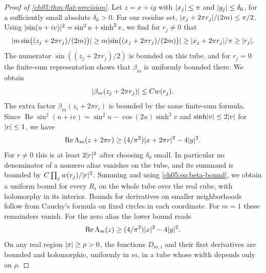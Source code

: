 \begin{proof}[Proof of \cref{ch05:thm:flat-precision}]
Let $z=x+iy$ with $\lvert x_j\rvert\le\pi$ and $\lvert y_j\rvert\le\delta_0$, for a sufficiently small absolute $\delta_0>0$. For our residue set, $\lvert x_j+2\pi r_j\rvert/(2m)\le\pi/2$. Using $\lvert \sin(u+iv)\rvert^2=\sin^2u+\sinh^2v$, we find for $r_j\ne0$ that
\[
 \lvert m\sin\bigl((z_j+2\pi r_j)/(2m)\bigr)\rvert\ge m\lvert \sin\bigl((x_j+2\pi r_j)/(2m)\bigr)\rvert\ge\lvert x_j+2\pi r_j\rvert/\pi\ge\lvert r_j\rvert.
\]
The numerator $\sin((z_j+2\pi r_j)/2)$ is bounded on this tube, and for $r_j=0$ the finite-sum representation shows that $\beta_m$ is uniformly bounded there. We obtain
\begin{equation}\label{ch05:eq:beta-bound}
 \lvert \beta_m(z_j+2\pi r_j)\rvert\le Cw(r_j).
\end{equation}
The extra factor $\beta_m(z_i+2\pi r_i)$ is bounded by the same finite-sum formula. Since $\operatorname{Re}\sin^2(u+iv)=\sin^2u-\cos(2u)\sinh^2v$ and $\sinh\lvert v\rvert\le2\lvert v\rvert$ for $\lvert v\rvert\le1$, we have
\[
 \operatorname{Re}\Lambda_m(z+2\pi r)\ge(4/\pi^2)\lvert x+2\pi r\rvert^2-4\lvert y\rvert^2.
\]
For $r\ne0$ this is at least $2\lvert r\rvert^2$ after choosing $\delta_0$ small. In particular no denominator of a nonzero alias vanishes on the tube, and its summand is bounded by $C\prod_jw(r_j)/\lvert r\rvert^2$. Summing and using \eqref{ch05:eq:beta-bound}, we obtain a uniform bound for every $R_i$ on the whole tube over the real cube, with holomorphy in its interior. Bounds for derivatives on smaller neighborhoods follow from Cauchy's formula on fixed circles in each coordinate. For $m=1$ these remainders vanish. For the zero alias the lower bound reads
\[
 \operatorname{Re}\Lambda_m(z)\ge(4/\pi^2)\lvert x\rvert^2-4\lvert y\rvert^2.
\]
On any real region $\lvert x\rvert\ge\rho>0$, the functions $D_{m,i}$ and their first derivatives are bounded and holomorphic, uniformly in $m$, in a tube whose width depends only on $\rho$.


\end{proof}
